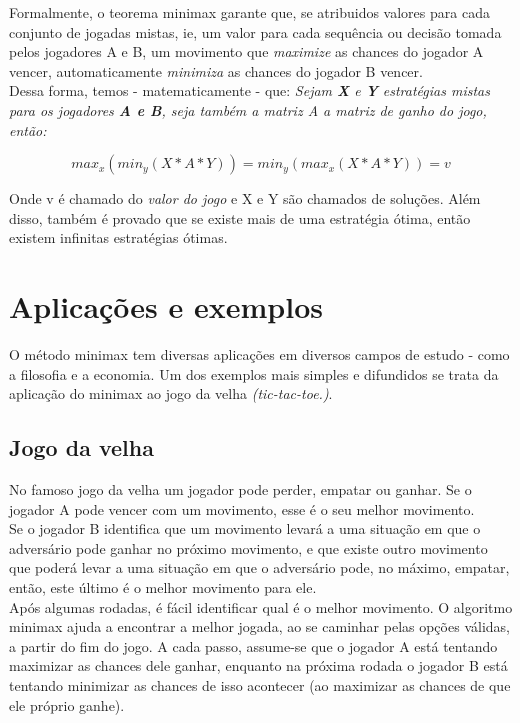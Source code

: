 \documentclass[]{article}
\begin{document}
	Formalmente, o teorema minimax garante que, se atribuidos valores para cada conjunto de jogadas mistas, ie, um valor para cada sequência ou decisão tomada pelos jogadores A e B, um movimento que \emph{maximize} as chances do jogador A vencer, automaticamente \emph{minimiza} as chances do jogador B vencer. \\
	
	Dessa forma, temos - matematicamente - que:
	\textit{Sejam \textbf{X} e \textbf{Y} estratégias mistas para os jogadores \textbf{A e B}, seja também a matriz A a matriz de ganho do jogo, então:}
	
	$$max_x (min_y(X*A*Y)) = min_y (max_x(X*A*Y)) = v $$
	
	Onde v é chamado do \textit{valor do jogo} e X e Y são chamados de soluções. Além disso, também é provado que se existe mais de uma estratégia ótima, então existem infinitas estratégias ótimas. \cite{wolfram}
	
	
	
	\section{Aplicações e exemplos}
	
	O método minimax tem diversas aplicações em diversos campos de estudo - como a filosofia e a economia. Um dos exemplos mais simples e difundidos se trata da aplicação do minimax ao jogo da velha \emph{(tic-tac-toe.)}.
	\subsection{Jogo da velha}
	No famoso jogo da velha um jogador pode perder, empatar ou ganhar. Se o jogador A pode vencer com um movimento, esse é o seu melhor movimento.\\
	
	Se o jogador B identifica que um movimento levará a uma situação em que o adversário pode ganhar no próximo movimento, e que existe outro movimento que poderá levar a uma situação em que o adversário pode, no máximo, empatar, então, este último é o melhor movimento para ele.\\
	
    Após algumas rodadas, é fácil identificar qual é o melhor movimento. O algoritmo minimax ajuda a encontrar a melhor jogada, ao se caminhar pelas opções válidas, a partir do fim do jogo. A cada passo, assume-se que o jogador A está tentando maximizar as chances dele ganhar, enquanto na próxima rodada o jogador B está tentando minimizar as chances de isso acontecer (ao maximizar as chances de que ele próprio ganhe). \\
\end{document}

